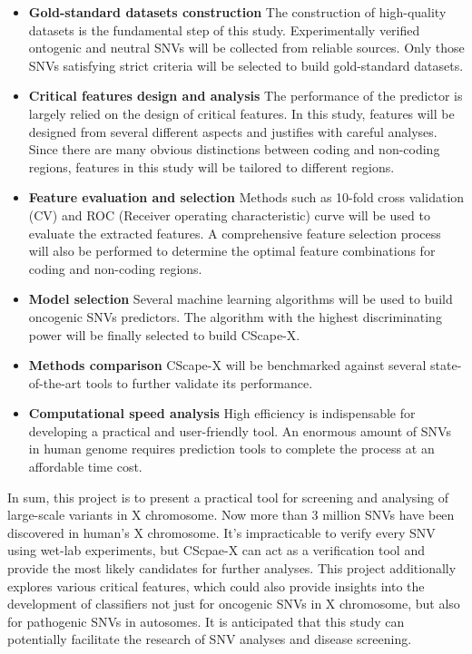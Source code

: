 \documentclass[a4paper,nohyper,nobib,openany,justified]{tufte-book}
\begin{document}
\begin{fullwidth}
\begin{itemize}
  \item \textbf{Gold-standard datasets construction} The construction of high-quality datasets is the fundamental step of this study. Experimentally verified ontogenic and neutral SNVs will be collected from reliable sources. Only those SNVs satisfying strict criteria will be selected to build gold-standard datasets.
  \item \textbf{Critical features design and analysis} The performance of the predictor is largely relied on the design of critical features. In this study, features will be designed from several different aspects and justifies with careful analyses. Since there are many obvious distinctions between coding and non-coding regions, features in this study will be tailored to different regions.
  \item \textbf{Feature evaluation and selection} Methods such as 10-fold cross validation (CV) and ROC (Receiver operating characteristic) curve will be used to evaluate the extracted features. A comprehensive feature selection process will also be performed to determine the optimal feature combinations for coding and non-coding regions.
  \item \textbf{Model selection} Several machine learning algorithms will be used to build oncogenic SNVs predictors. The algorithm with the highest discriminating power will be finally selected to build CScape-X.
  \item \textbf{Methods comparison} CScape-X will be benchmarked against several state-of-the-art tools to further validate its performance.
  \item \textbf{Computational speed analysis} High efficiency is indispensable for developing a practical and user-friendly tool. An enormous amount of SNVs in human genome requires prediction tools to complete the process at an affordable time cost.
\end{itemize}

In sum, this project is to present a practical tool for screening and analysing of large-scale variants in X chromosome. Now more than 3 million SNVs have been discovered in human's X chromosome. It's impracticable to verify every SNV using wet-lab experiments, but CScpae-X can act as a verification tool and provide the most likely candidates for further analyses. This project additionally explores various critical features, which could also provide insights into the development of classifiers not just for oncogenic SNVs in X chromosome, but also for pathogenic SNVs in autosomes. It is anticipated that this study can potentially facilitate the research of SNV analyses and disease screening.


\end{fullwidth}
\end{document}
